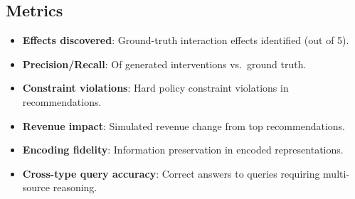\subsection{Metrics}

\begin{itemize}
    \item \textbf{Effects discovered}: Ground-truth interaction effects identified (out of 5).
    \item \textbf{Precision/Recall}: Of generated interventions vs.\ ground truth.
    \item \textbf{Constraint violations}: Hard policy constraint violations in recommendations.
    \item \textbf{Revenue impact}: Simulated revenue change from top recommendations.
    \item \textbf{Encoding fidelity}: Information preservation in encoded representations.
    \item \textbf{Cross-type query accuracy}: Correct answers to queries requiring multi-source reasoning.
\end{itemize}
